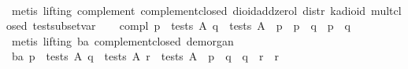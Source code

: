 \begin{isabellebody}
%
\isadelimproof
\ \ \ \ %
\endisadelimproof
%
\isatagproof
{}\isamarkupfalse%
\ {}metis\ {}lifting{}\ complement{}\ complement{}closed\ dioid{}add{}zerol\ distr\ ka{}dioid\ mult{}closed\ test{}subset{}var{}%
\endisatagproof
{\isafoldproof}%
%
\isadelimproof
\isanewline
%
\endisadelimproof
\isanewline
\ \ \isamarkupfalse%
\ compl{}{}{}\ {}{}p\ {}\ tests\ A{}\ q\ {}\ tests\ A{}\ {}\ {}p\ {}\ {}{}p\ {}\ q{}\ {}\ {}{}p\ {}\ {}q{}{}\isanewline
%
\isadelimproof
\ \ \ \ %
\endisadelimproof
%
\isatagproof
{}\isamarkupfalse%
\ {}metis\ {}lifting{}\ ba{}{}\ complement{}closed\ de{}morgan{}{}%
\endisatagproof
{\isafoldproof}%
%
\isadelimproof
\isanewline
%
\endisadelimproof
\isanewline
\ \ \isamarkupfalse%
\ ba{}{}{}\ {}{}p\ {}\ tests\ A{}\ q\ {}\ tests\ A{}\ r\ {}\ tests\ A{}\ {}\ p\ {}\ q\ {}\ {}q\ {}\ r\ {}\ {}r{}\isanewline

\end{isabellebody}
